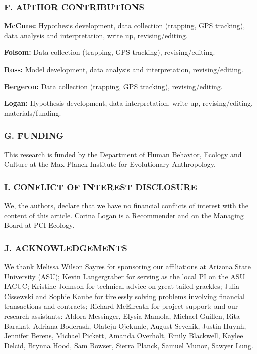\documentclass[
]{article}
\begin{document}
\hypertarget{f.-author-contributions}{%
\subsubsection{F. AUTHOR CONTRIBUTIONS}\label{f.-author-contributions}}

\textbf{McCune:} Hypothesis development, data collection (trapping, GPS
tracking), data analysis and interpretation, write up, revising/editing.

\textbf{Folsom:} Data collection (trapping, GPS tracking),
revising/editing.

\textbf{Ross:} Model development, data analysis and interpretation,
revising/editing.

\textbf{Bergeron:} Data collection (trapping, GPS tracking),
revising/editing.

\textbf{Logan:} Hypothesis development, data interpretation, write up,
revising/editing, materials/funding.

\hypertarget{g.-funding}{%
\subsubsection{G. FUNDING}\label{g.-funding}}

This research is funded by the Department of Human Behavior, Ecology and
Culture at the Max Planck Institute for Evolutionary Anthropology.

\hypertarget{i.-conflict-of-interest-disclosure}{%
\subsubsection{I. CONFLICT OF INTEREST
DISCLOSURE}\label{i.-conflict-of-interest-disclosure}}

We, the authors, declare that we have no financial conflicts of interest
with the content of this article. Corina Logan is a Recommender and on
the Managing Board at PCI Ecology.

\hypertarget{j.-acknowledgements}{%
\subsubsection{J. ACKNOWLEDGEMENTS}\label{j.-acknowledgements}}

We thank Melissa Wilson Sayres for sponsoring our affiliations at
Arizona State University (ASU); Kevin Langergraber for serving as the
local PI on the ASU IACUC; Kristine Johnson for technical advice on
great-tailed grackles; Julia Cissewski and Sophie Kaube for tirelessly
solving problems involving financial transactions and contracts; Richard
McElreath for project support; and our research assistants: Aldora
Messinger, Elysia Mamola, Michael Guillen, Rita Barakat, Adriana
Boderash, Olateju Ojekunle, August Sevchik, Justin Huynh, Jennifer
Berens, Michael Pickett, Amanda Overholt, Emily Blackwell, Kaylee
Delcid, Brynna Hood, Sam Bowser, Sierra Planck, Samuel Munoz, Sawyer
Lung.
\end{document}
